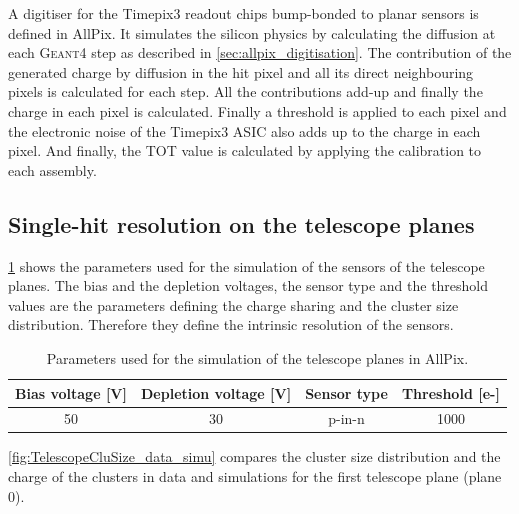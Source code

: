 A digitiser for the Timepix3 readout chips bump-bonded to planar
sensors is defined in AllPix. It simulates the silicon physics by
calculating the diffusion at each \textsc{Geant4} step as described in
\cref{sec:allpix_digitisation}. The contribution of the generated
charge by diffusion in the hit pixel and all its direct neighbouring
pixels is calculated for each step. All the contributions add-up and
finally the charge in each pixel is calculated. Finally a threshold is
applied to each pixel and the electronic noise of the Timepix3 ASIC
also adds up to the charge in each pixel. And finally, the TOT value
is calculated by applying the calibration to each assembly.

\subsection{Single-hit resolution on the telescope planes}

\cref{tab:AllPixTelescopePlanesParams} shows the parameters used for
the simulation of the sensors of the telescope planes. The bias and
the depletion voltages, the sensor type and the threshold values are
the parameters defining the charge sharing and the cluster size
distribution. Therefore they define the intrinsic resolution of the
sensors.

\begin{table}[htbp]
  \centering
  \caption{Parameters used for the simulation of the telescope planes in AllPix.}
  \label{tab:AllPixTelescopePlanesParams}
  \begin{tabular}{cccc}
    \toprule
    Bias voltage [V] & Depletion voltage [V] & Sensor type & Threshold [e-] \\
    \midrule
    50 & 30 & p-in-n & 1000 \\
    \bottomrule
  \end{tabular}
\end{table}


\cref{fig:TelescopeCluSize_data_simu} compares the cluster size
distribution and the charge of the clusters in data and simulations
for the first telescope plane (plane 0).

